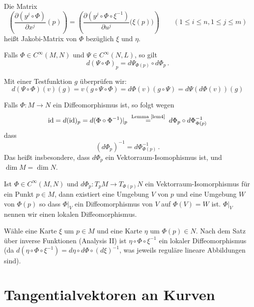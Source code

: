 \documentclass[a4paper,twoside,DIV15,BCOR12mm]{scrbook}
\begin{document}
\begin{definition}
Die Matrix 
\[
\left( \frac{\partial (y^j\circ \Phi)}{\partial x^j}(p)\right) 
= \left( \frac{\partial(y^j\circ \Phi \circ \xi^{-1})}{\partial u^j}\big(\xi(p)\big)\right)
\qquad (1\le i\le n, 1\le j\le m)
\]
heißt Jakobi-Matrix von $\Phi$ bezüglich $\xi$ und $\eta$.
\end{definition}

\begin{lemma}[Kettenregel]
\label{lem4}
Falls $\Phi\in C^\infty(M,N)$ und $\Psi \in C^\infty(N,L)$, so gilt
\[
d(\Psi\circ\Phi)_p = d\Psi_{\Phi(p)} \circ d\Phi_p\,.
\]
\end{lemma}

\begin{beweis}
Mit einer Testfunktion $g$ überprüfen wir:
\[
d(\Psi \circ \Phi)(v)(g) = v(g \circ \Psi \circ \Phi) = d\Phi(v)(g \circ \Psi) = d\Psi(d\Phi(v))(g)
\]
\end{beweis}

\begin{bemerkung}
Falls $\Phi: M\to N$ ein Diffeomorphismus ist, so folgt wegen
\[ \text{id} = d(\text{id})_p = d(\Phi \circ \Phi^{-1})|_p \gleichnach{Lemma \ref{lem4}} d\Phi_p \circ d\Phi^{-1}_{\Phi(p)} \]
dass
\[ (d\Phi_p)^{-1} = d\Phi_{\Phi(p)}^{-1}\,. \]
Das heißt insbesondere, dass $d\Phi_p$ ein Vektorraum-Isomophismus ist, und $\dim M = \dim N$.
\end{bemerkung}

\begin{satz}
\label{invfunk}
Ist $\Phi \in C^\infty(M,N)$ und $d\Phi_p:T_pM \to T_{\Phi(p)}N$ ein Vektorraum-Isomorphismus für ein Punkt $p\in M$, dann existiert eine Umgebung $V$ von $p$ und eine Umgebung $W$ von $\Phi(p)$ so dass $\Phi|_V$ ein Diffeomorphismus von $V$ auf $\Phi(V)=W$ ist. $\Phi|_V$ nennen wir einen lokalen Diffeomorphismus.
\end{satz}

\begin{beweis}
Wähle eine Karte $\xi$ um $p\in M$ und eine Karte $\eta$ um $\Phi(p)\in N$. Nach dem Satz über inverse Funktionen (Analysis II) ist $\eta \circ \Phi \circ \xi^{-1}$ ein lokaler Diffeomorphismus (da $d(\eta \circ \Phi \circ \xi^{-1}) = d\eta \circ d\Phi \circ (d\xi)^{-1}$, was jeweils reguläre lineare Abbildungen sind).
\end{beweis}

\section{Tangentialvektoren an Kurven}
\end{document}
